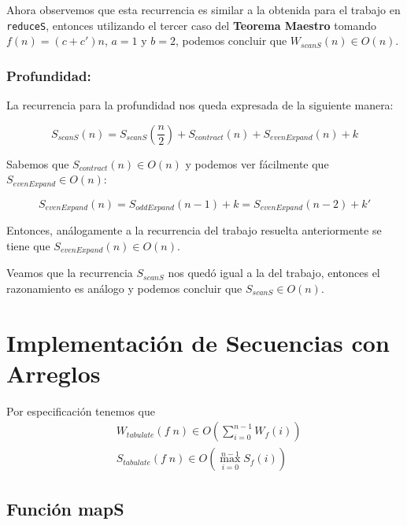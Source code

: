 \documentclass[11pt]{article}
\begin{document}
Ahora observemos que esta recurrencia es similar a la obtenida para el 
trabajo en \texttt{reduceS}, entonces utilizando el tercer caso del \textbf{Teorema Maestro} tomando
$f(n) = (c + c')n$, $a = 1$ y $b = 2$, podemos concluir que $W_{scanS}(n) \in O(n)$. 

\subsubsection{Profundidad:}

La recurrencia para la profundidad nos queda expresada de la siguiente manera:

\begin{equation*}
    S_{scanS}(n) = S_{scanS}(\frac{n}{2}) + S_{contract}(n) + S_{evenExpand}(n) + k 
\end{equation*}

Sabemos que $S_{contract}(n) \in O(n)$ y podemos ver fácilmente que $S_{evenExpand} \in O(n)$:

\begin{equation*}
    S_{evenExpand}(n) = S_{oddExpand}(n - 1) + k = S_{evenExpand}(n - 2) + k'
\end{equation*}

Entonces, análogamente a la recurrencia del trabajo resuelta anteriormente se tiene
que $S_{evenExpand}(n) \in O(n)$.


Veamos que la recurrencia $S_{scanS}$ nos quedó igual a la del trabajo, entonces el
razonamiento es análogo y podemos concluir que $S_{scanS} \in O(n)$.


\section{Implementación de Secuencias con Arreglos}

Por especificación tenemos que
\begin{align*}
& W_{tabulate}(f \; n) \in O\left(\displaystyle\sum_{i=0}^{n - 1}W_f(i)\right) \\
& S_{tabulate}(f \; n) \in O\left(\displaystyle\max_{i=0}^{n - 1}S_f(i)\right)
\end{align*}

\subsection{Función mapS}
\end{document}
